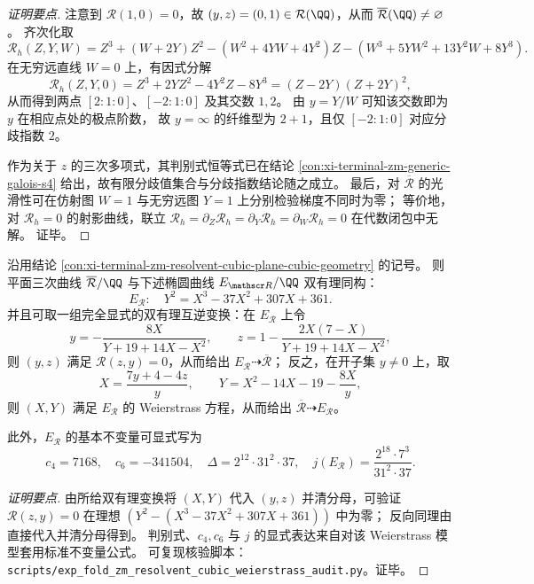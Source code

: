 \begin{proof}[证明要点]
注意到 \(\mathscr R(1,0)=0\)，故 \((y,z)=(0,1)\in \mathcal R(\QQ)\)，从而 \(\overline{\mathcal R}(\QQ)\neq\varnothing\)。
齐次化取
\[
\mathscr R_h(Z,Y,W)
=Z^3+(W+2Y)Z^2-(W^2+4YW+4Y^2)Z-(W^3+5YW^2+13Y^2W+8Y^3).
\]
在无穷远直线 \(W=0\) 上，有因式分解
\[
\mathscr R_h(Z,Y,0)=Z^3+2YZ^2-4Y^2Z-8Y^3=(Z-2Y)(Z+2Y)^2,
\]
从而得到两点 \([2:1:0]\)、\([-2:1:0]\) 及其交数 \(1,2\)。
由 \(y=Y/W\) 可知该交数即为 \(y\) 在相应点处的极点阶数，
故 \(y=\infty\) 的纤维型为 \(2+1\)，且仅 \([-2:1:0]\) 对应分歧指数 \(2\)。
\par
作为关于 \(z\) 的三次多项式，其判别式恒等式已在结论 \ref{con:xi-terminal-zm-generic-galois-s4} 给出，故有限分歧值集合与分歧指数结论随之成立。
最后，对 \(\overline{\mathcal R}\) 的光滑性可在仿射图 \(W=1\) 与无穷远图 \(Y=1\) 上分别检验梯度不同时为零；
等价地，对 \(\mathscr R_h=0\) 的射影曲线，联立 \(\mathscr R_h=\partial_Z\mathscr R_h=\partial_Y\mathscr R_h=\partial_W\mathscr R_h=0\) 在代数闭包中无解。
证毕。
\end{proof}

\begin{conclusion}\label{con:xi-terminal-zm-resolvent-cubic-weierstrass-birational}
沿用结论 \ref{con:xi-terminal-zm-resolvent-cubic-plane-cubic-geometry} 的记号。
则平面三次曲线 \(\overline{\mathcal R}/\QQ\) 与下述椭圆曲线 \(E_{\mathscr R}/\QQ\) 双有理同构：
\[
E_{\mathscr R}:\quad Y^2=X^3-37X^2+307X+361.
\]
并且可取一组完全显式的双有理互逆变换：在 \(E_{\mathscr R}\) 上令
\[
y=-\frac{8X}{Y+19+14X-X^2},
\qquad
z=1-\frac{2X(7-X)}{Y+19+14X-X^2},
\]
则 \((y,z)\) 满足 \(\mathscr R(z,y)=0\)，从而给出 \(E_{\mathscr R}\dashrightarrow \overline{\mathcal R}\)；
反之，在开子集 \(y\neq 0\) 上，取
\[
X=\frac{7y+4-4z}{y},
\qquad
Y=X^2-14X-19-\frac{8X}{y},
\]
则 \((X,Y)\) 满足 \(E_{\mathscr R}\) 的 Weierstrass 方程，从而给出 \(\overline{\mathcal R}\dashrightarrow E_{\mathscr R}\)。
\par
此外，\(E_{\mathscr R}\) 的基本不变量可显式写为
\[
c_4=7168,\quad c_6=-341504,\quad \Delta=2^{12}\cdot 31^{2}\cdot 37,\quad
j(E_{\mathscr R})=\frac{2^{18}\cdot 7^{3}}{31^{2}\cdot 37}.
\]
\end{conclusion}
\begin{proof}[证明要点]
由所给双有理变换将 \((X,Y)\) 代入 \((y,z)\) 并清分母，可验证 \(\mathscr R(z,y)=0\) 在理想 \((Y^2-(X^3-37X^2+307X+361))\) 中为零；
反向同理由直接代入并清分母得到。
判别式、\(c_4,c_6\) 与 \(j\) 的显式表达来自对该 Weierstrass 模型套用标准不变量公式。
可复现核验脚本：\texttt{scripts/exp\_fold\_zm\_resolvent\_cubic\_weierstrass\_audit.py}。证毕。
\end{proof}

